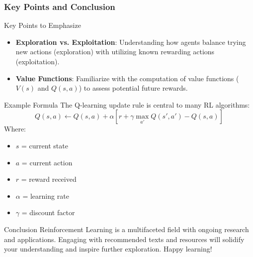 \documentclass[aspectratio=169]{beamer}
\begin{document}
\begin{frame}[fragile]
    \frametitle{Key Points and Conclusion}
    \begin{block}{Key Points to Emphasize}
        \begin{itemize}
            \item \textbf{Exploration vs. Exploitation}: Understanding how agents balance trying new actions (exploration) with utilizing known rewarding actions (exploitation).
            \item \textbf{Value Functions}: Familiarize with the computation of value functions (\(V(s)\) and \(Q(s, a)\)) to assess potential future rewards.
        \end{itemize}
    \end{block}

    \begin{block}{Example Formula}
        The Q-learning update rule is central to many RL algorithms:
        \begin{equation}
            Q(s, a) \leftarrow Q(s, a) + \alpha [r + \gamma \max_{a'} Q(s', a') - Q(s, a)]
        \end{equation}
        Where:
        \begin{itemize}
            \item \(s\) = current state
            \item \(a\) = current action
            \item \(r\) = reward received
            \item \(\alpha\) = learning rate
            \item \(\gamma\) = discount factor
        \end{itemize}
    \end{block}
    
    \begin{block}{Conclusion}
        Reinforcement Learning is a multifaceted field with ongoing research and applications. Engaging with recommended texts and resources will solidify your understanding and inspire further exploration. Happy learning!
    \end{block}
\end{frame}
\end{document}
